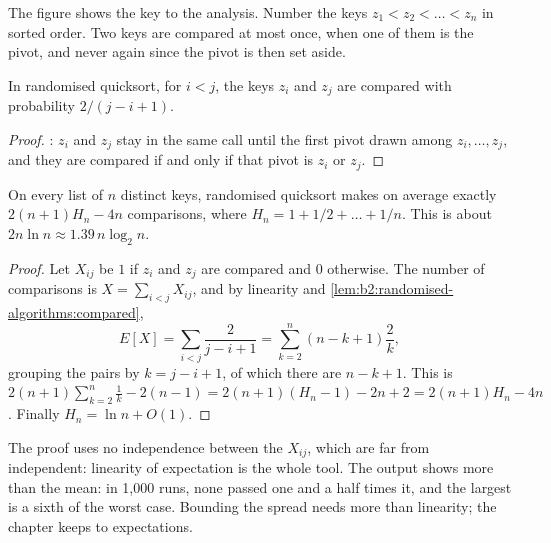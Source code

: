 The figure shows the key to the analysis. Number the keys $z_1 < z_2 < \dots < z_n$ in sorted order. Two keys are
compared at most once, when one of them is the pivot, and never again since the pivot is then set aside.

\begin{lemma}\label{lem:b2:randomised-algorithms:compared}
In randomised quicksort, for $i < j$, the keys $z_i$ and $z_j$ are compared with probability $2/(j - i + 1)$.
\end{lemma}

\begin{proof}
: $z_i$ and $z_j$ stay in the same call until the first pivot drawn among $z_i,
\dots, z_j$, and they are compared if and only if that pivot is $z_i$ or $z_j$.
\end{proof}

\begin{theorem}\label{thm:b2:randomised-algorithms:quicksort}
On every list of $n$ distinct keys, randomised quicksort makes on average exactly $2(n + 1)H_n - 4n$ comparisons, where
$H_n = 1 + 1/2 + \dots + 1/n$. This is about $2n \ln n \approx 1.39\, n \log_2 n$.
\end{theorem}

\begin{proof}
Let $X_{ij}$ be $1$ if $z_i$ and $z_j$ are compared and $0$ otherwise. The number of comparisons is $X = \sum_{i < j}
X_{ij}$, and by linearity and \cref{lem:b2:randomised-algorithms:compared},
\[
E[X] = \sum_{i < j} \frac{2}{j - i + 1} = \sum_{k = 2}^{n} (n - k + 1) \frac{2}{k},
\]
grouping the pairs by $k = j - i + 1$, of which there are $n - k + 1$. This is $2(n + 1)\sum_{k = 2}^{n} \frac{1}{k} -
2(n - 1) = 2(n + 1)(H_n - 1) - 2n + 2 = 2(n + 1)H_n - 4n$. Finally $H_n = \ln n + O(1)$.
\end{proof}

\label{out:b2:randomised-algorithms:quicksort}

The proof uses no independence between the $X_{ij}$, which are far from independent: linearity of expectation is the
whole tool. The output shows more than the mean: in 1,000 runs, none passed one and a half times it, and the largest is
a sixth of the worst case. Bounding the spread needs more than linearity; the chapter keeps to expectations.


